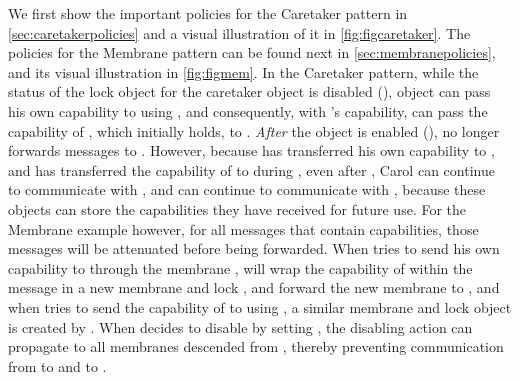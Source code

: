 \documentclass[a4paper,11pt,twoside]{article}
\begin{document}
{We first show the important policies for the Caretaker pattern in \cref{sec:caretakerpolicies} and a visual illustration of it in \cref{fig:figcaretaker}. The policies for the Membrane pattern can be found next in \cref{sec:membranepolicies}, and its visual illustration in \cref{fig:figmem}. In the Caretaker pattern, while the status of the lock object  for the caretaker object  is disabled (), object  can pass his own capability to  using , and consequently, with 's capability,  can pass the capability of , which  initially holds, to . \textit{After} the  object is enabled (),  no longer forwards messages to . However, because  has transferred his own capability to , and  has transferred the capability of  to  during , even after , Carol can continue to communicate with , and  can continue to communicate with , because these objects can store the capabilities they have received for future use. For the Membrane example however, for all messages that contain capabilities, those messages will be attenuated before being forwarded. When  tries to send his own capability to  through the membrane ,  will wrap the capability of  within the message in a new membrane  and lock , and forward the new membrane   to , and when  tries to send the capability of  to  using , a similar membrane  and lock object is created by . When  decides to disable  by setting , the disabling action can propagate to all membranes descended from , thereby preventing communication from  to  and  to .

\clearpage
\begin{minipage}{\textwidth}

\end{minipage}}
\end{document}
